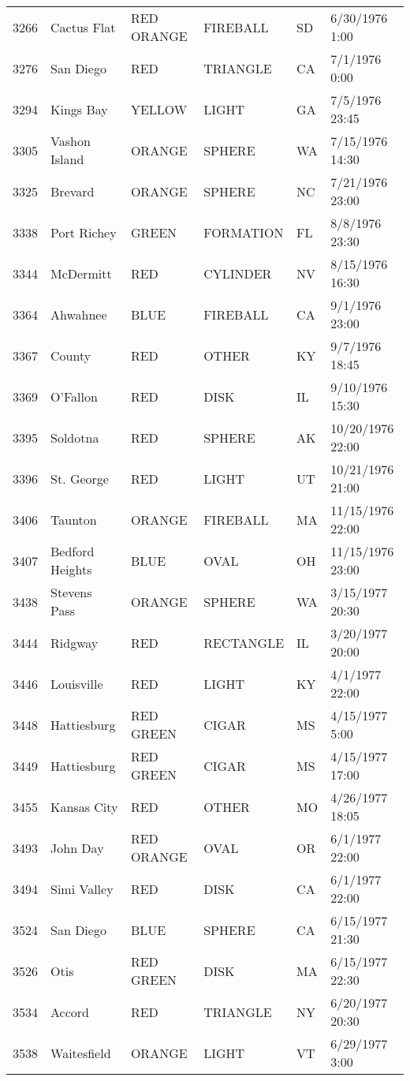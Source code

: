 \begin{tabular}{llllll}
3266 & Cactus Flat & RED ORANGE & FIREBALL & SD & 6/30/1976 1:00 \\
3276 & San Diego & RED & TRIANGLE & CA & 7/1/1976 0:00 \\
3294 & Kings Bay & YELLOW & LIGHT & GA & 7/5/1976 23:45 \\
3305 & Vashon Island & ORANGE & SPHERE & WA & 7/15/1976 14:30 \\
3325 & Brevard & ORANGE & SPHERE & NC & 7/21/1976 23:00 \\
3338 & Port Richey & GREEN & FORMATION & FL & 8/8/1976 23:30 \\
3344 & McDermitt & RED & CYLINDER & NV & 8/15/1976 16:30 \\
3364 & Ahwahnee & BLUE & FIREBALL & CA & 9/1/1976 23:00 \\
3367 & County & RED & OTHER & KY & 9/7/1976 18:45 \\
3369 & O'Fallon & RED & DISK & IL & 9/10/1976 15:30 \\
3395 & Soldotna & RED & SPHERE & AK & 10/20/1976 22:00 \\
3396 & St. George & RED & LIGHT & UT & 10/21/1976 21:00 \\
3406 & Taunton & ORANGE & FIREBALL & MA & 11/15/1976 22:00 \\
3407 & Bedford Heights & BLUE & OVAL & OH & 11/15/1976 23:00 \\
3438 & Stevens Pass & ORANGE & SPHERE & WA & 3/15/1977 20:30 \\
3444 & Ridgway & RED & RECTANGLE & IL & 3/20/1977 20:00 \\
3446 & Louisville & RED & LIGHT & KY & 4/1/1977 22:00 \\
3448 & Hattiesburg & RED GREEN & CIGAR & MS & 4/15/1977 5:00 \\
3449 & Hattiesburg & RED GREEN & CIGAR & MS & 4/15/1977 17:00 \\
3455 & Kansas City & RED & OTHER & MO & 4/26/1977 18:05 \\
3493 & John Day & RED ORANGE & OVAL & OR & 6/1/1977 22:00 \\
3494 & Simi Valley & RED & DISK & CA & 6/1/1977 22:00 \\
3524 & San Diego & BLUE & SPHERE & CA & 6/15/1977 21:30 \\
3526 & Otis & RED GREEN & DISK & MA & 6/15/1977 22:30 \\
3534 & Accord & RED & TRIANGLE & NY & 6/20/1977 20:30 \\
3538 & Waitesfield & ORANGE & LIGHT & VT & 6/29/1977 3:00 \\

\end{tabular}
